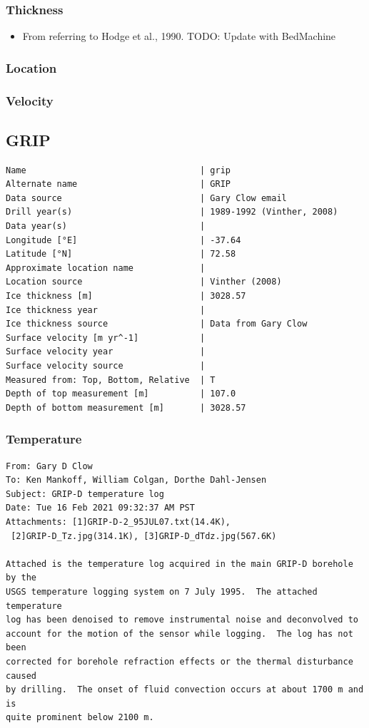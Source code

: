 \documentclass[article,a4paper,times,11pt,twoside]{article}
\begin{document}
\subsubsection{Thickness}
\label{sec:orgbcfa3e4}

\begin{itemize}
\item From \textcite{cuffey_1992} referring to Hodge et al., 1990. TODO: Update with BedMachine
\end{itemize}

\subsubsection{Location}
\label{sec:orgf893aaf}

\subsubsection{Velocity}
\label{sec:org640aff0}
\clearpage
\subsection{GRIP}
\label{sec:orgd4fa5f1}
\begin{verbatim}
Name                                  | grip
Alternate name                        | GRIP
Data source                           | Gary Clow email
Drill year(s)                         | 1989-1992 (Vinther, 2008)
Data year(s)                          | 
Longitude [°E]                        | -37.64
Latitude [°N]                         | 72.58
Approximate location name             | 
Location source                       | Vinther (2008)
Ice thickness [m]                     | 3028.57
Ice thickness year                    | 
Ice thickness source                  | Data from Gary Clow
Surface velocity [m yr^-1]            | 
Surface velocity year                 | 
Surface velocity source               | 
Measured from: Top, Bottom, Relative  | T
Depth of top measurement [m]          | 107.0
Depth of bottom measurement [m]       | 3028.57
\end{verbatim}

\subsubsection{Temperature}
\label{sec:org8f4277e}

\begin{verbatim}
From: Gary D Clow
To: Ken Mankoff, William Colgan, Dorthe Dahl-Jensen
Subject: GRIP-D temperature log
Date: Tue 16 Feb 2021 09:32:37 AM PST
Attachments: [1]GRIP-D-2_95JUL07.txt(14.4K),
 [2]GRIP-D_Tz.jpg(314.1K), [3]GRIP-D_dTdz.jpg(567.6K)

Attached is the temperature log acquired in the main GRIP-D borehole by the
USGS temperature logging system on 7 July 1995.  The attached temperature
log has been denoised to remove instrumental noise and deconvolved to
account for the motion of the sensor while logging.  The log has not been
corrected for borehole refraction effects or the thermal disturbance caused
by drilling.  The onset of fluid convection occurs at about 1700 m and is
quite prominent below 2100 m.
\end{verbatim}
\end{document}
